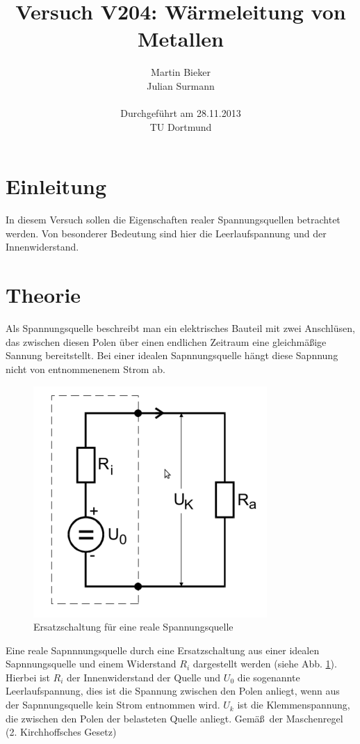 \documentclass[11pt]{article}
\title{\textbf{Versuch V204: Wärmeleitung von Metallen}}
\author{Martin Bieker\\
		Julian Surmann\\
		\\
		Durchgef\"{u}hrt am 28.11.2013\\
		TU Dortmund}
\date{}
\begin{document}
\renewcommand\tablename{Tabelle}
\renewcommand\figurename{Abbildung}
\maketitle
\thispagestyle{empty}
\newpage
\clearpage
\setcounter{page}{1}

\section{Einleitung}
In diesem Versuch sollen die Eigenschaften realer Spannungsquellen betrachtet werden. Von besonderer Bedeutung sind hier die Leerlaufspannung und der Innenwiderstand.
\section{Theorie}
Als Spannungsquelle beschreibt man ein elektrisches Bauteil mit zwei Anschl\"usen, das zwischen diesen Polen \"uber einen endlichen Zeitraum eine gleichm\"a\ss ige Sannung bereitstellt. Bei einer idealen Sapnnungsquelle h\"angt diese Sapnnung nicht von entnommenenem Strom ab.
\begin{figure}[htp]
\centering
\includegraphics[scale=1.00]{abb3.png}
\caption{Ersatzschaltung f\"ur eine reale Spannungsquelle}
\label{Ersatz}
\end{figure}
Eine reale Sapnnnungsquelle durch eine Ersatzschaltung aus einer idealen Sapnnungsquelle und einem Widerstand $R_i$ dargestellt werden (siehe Abb. \ref{Ersatz}). Hierbei ist $R_i$ der Innenwiderstand der Quelle und  $U_0$ die sogenannte Leerlaufspannung, dies ist die Spannung zwischen den Polen anliegt, wenn aus der Sapnnungsquelle kein Strom entnommen wird. $U_k$ ist die Klemmenspannung, die zwischen den Polen der belasteten Quelle anliegt. Gem\"a\ss\ der Maschenregel (2. Kirchhoffsches Gesetz)
\end{document}
